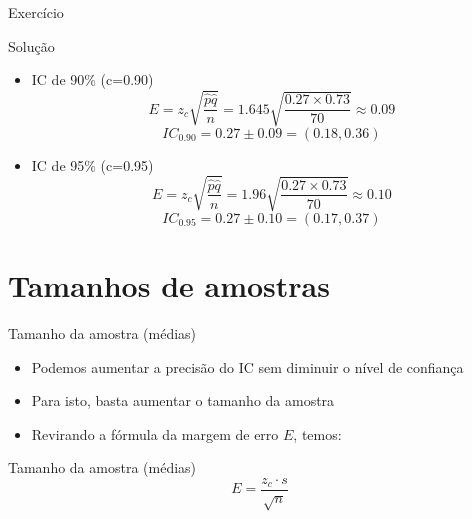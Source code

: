 \documentclass{beamer}
\begin{document}
\begin{frame}{Exercício}
  \begin{block}{Solução}
    \begin{itemize}
    \item IC de 90\% (c=0.90)
      \begin{displaymath}
        E = z_c \sqrt{\frac{\hat{p}\hat{q} }{n}} = 1.645 \sqrt{\frac{0.27
            \times 0.73}{70} } \approx 0.09
      \end{displaymath}
      \begin{displaymath}
        IC_{0.90} = 0.27 \pm 0.09 = (0.18 , 0.36)
      \end{displaymath}
    \item IC de 95\% (c=0.95)
      \begin{displaymath}
        E = z_c \sqrt{\frac{\hat{p}\hat{q} }{n}} = 1.96 \sqrt{\frac{0.27
            \times 0.73}{70} } \approx 0.10
      \end{displaymath}
      \begin{displaymath}
        IC_{0.95} = 0.27 \pm 0.10 = (0.17 , 0.37)
      \end{displaymath}
    \end{itemize}
  \end{block}
\end{frame}

\section{Tamanhos de amostras}

\begin{frame}{Tamanho da amostra (médias)}
  \begin{itemize}
  \item Podemos aumentar a precisão do IC sem diminuir o nível de confiança
  \item Para isto, basta aumentar o tamanho da amostra
  \item Revirando a fórmula da margem de erro $E$, temos:
  \end{itemize}
\end{frame}

\begin{frame}{Tamanho da amostra (médias)}
  \begin{displaymath}
    E = \frac{z_c \cdot s}{\sqrt{n}} 
  \end{displaymath}
\end{frame}
\end{document}
